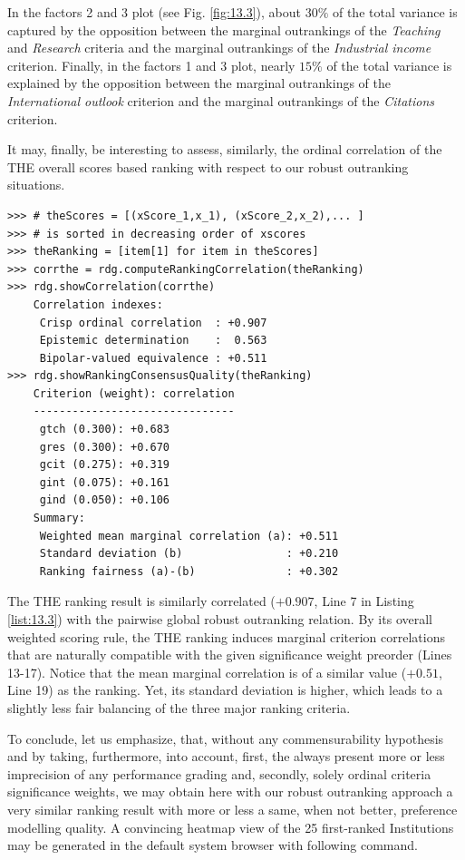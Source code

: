 In the factors 2 and 3 plot (see Fig. \ref{fig:13.3}), about $30\%$ of the total variance is captured by the opposition between the marginal outrankings of the \emph{Teaching} and \emph{Research} criteria and the marginal outrankings of the \emph{Industrial income} criterion. Finally, in the factors 1 and 3 plot, nearly $15\%$ of the total variance is explained by the opposition between the marginal outrankings of the \emph{International outlook} criterion and the marginal outrankings of the \emph{Citations} criterion.

It may, finally, be interesting to assess, similarly, the ordinal correlation of the THE overall scores based ranking with respect to our robust outranking situations.

\begin{lstlisting}[caption={Computing the ordinal quality of the THE ranking},label=list:13.13]
>>> # theScores = [(xScore_1,x_1), (xScore_2,x_2),... ]
>>> # is sorted in decreasing order of xscores
>>> theRanking = [item[1] for item in theScores]
>>> corrthe = rdg.computeRankingCorrelation(theRanking)
>>> rdg.showCorrelation(corrthe)
    Correlation indexes:
     Crisp ordinal correlation  : +0.907
     Epistemic determination    :  0.563
     Bipolar-valued equivalence : +0.511
>>> rdg.showRankingConsensusQuality(theRanking)
    Criterion (weight): correlation
    -------------------------------
     gtch (0.300): +0.683
     gres (0.300): +0.670
     gcit (0.275): +0.319
     gint (0.075): +0.161
     gind (0.050): +0.106
    Summary:
     Weighted mean marginal correlation (a): +0.511
     Standard deviation (b)                : +0.210
     Ranking fairness (a)-(b)              : +0.302
\end{lstlisting}

The THE ranking result is similarly correlated ($+0.907$, Line 7 in Listing \ref{list:13.3}) with the pairwise global robust outranking relation. By its overall weighted scoring rule, the THE ranking induces marginal criterion correlations that are naturally compatible with the given significance weight preorder (Lines 13-17). Notice that the mean marginal correlation is of a similar value ($+0.51$, Line 19) as the \NetFlows ranking. Yet, its standard deviation is higher, which leads to a slightly less fair balancing of the three major ranking criteria.

To conclude, let us emphasize, that, without any commensurability hypothesis and by taking, furthermore, into account, first, the always present more or less imprecision of any performance grading and, secondly, solely ordinal criteria significance weights, we may obtain here with our robust outranking approach a very similar ranking result with more or less a same, when not better, preference modelling quality. A convincing heatmap view of the 25 first-ranked Institutions may be generated in the default system browser with following command.

